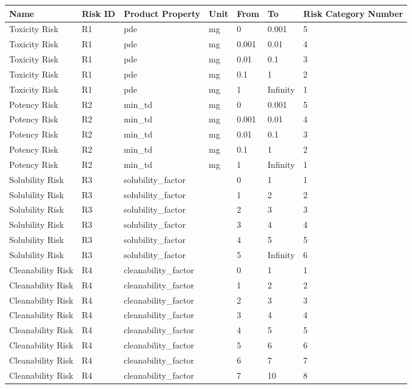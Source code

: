 \documentclass{article}
\begin{document}
        \begin{longtable}[l]{|p{3cm}|p{2cm}|p{3cm}|p{1.3cm}|p{1cm}|p{1cm}|p{4cm}|}

\hline
Name & Risk ID & Product Property & Unit & From & To & Risk Category Number\\
\hline

Toxicity Risk & R1 & pde & mg & 0 & 0.001 & 5\\
\hline
Toxicity Risk & R1 & pde & mg & 0.001 & 0.01 & 4\\
\hline
Toxicity Risk & R1 & pde & mg & 0.01 & 0.1 & 3\\
\hline
Toxicity Risk & R1 & pde & mg & 0.1 & 1 & 2\\
\hline
Toxicity Risk & R1 & pde & mg & 1 & Infinity & 1\\
\hline
Potency Risk & R2 & min\_td & mg & 0 & 0.001 & 5\\
\hline
Potency Risk & R2 & min\_td & mg & 0.001 & 0.01 & 4\\
\hline
Potency Risk & R2 & min\_td & mg & 0.01 & 0.1 & 3\\
\hline
Potency Risk & R2 & min\_td & mg & 0.1 & 1 & 2\\
\hline
Potency Risk & R2 & min\_td & mg & 1 & Infinity & 1\\
\hline
Solubility Risk & R3 & solubility\_factor &  & 0 & 1 & 1\\
\hline
Solubility Risk & R3 & solubility\_factor &  & 1 & 2 & 2\\
\hline
Solubility Risk & R3 & solubility\_factor &  & 2 & 3 & 3\\
\hline
Solubility Risk & R3 & solubility\_factor &  & 3 & 4 & 4\\
\hline
Solubility Risk & R3 & solubility\_factor &  & 4 & 5 & 5\\
\hline
Solubility Risk & R3 & solubility\_factor &  & 5 & Infinity & 6\\
\hline
Cleanability Risk & R4 & cleanability\_factor &  & 0 & 1 & 1\\
\hline
Cleanability Risk & R4 & cleanability\_factor &  & 1 & 2 & 2\\
\hline
Cleanability Risk & R4 & cleanability\_factor &  & 2 & 3 & 3\\
\hline
Cleanability Risk & R4 & cleanability\_factor &  & 3 & 4 & 4\\
\hline
Cleanability Risk & R4 & cleanability\_factor &  & 4 & 5 & 5\\
\hline
Cleanability Risk & R4 & cleanability\_factor &  & 5 & 6 & 6\\
\hline
Cleanability Risk & R4 & cleanability\_factor &  & 6 & 7 & 7\\
\hline
Cleanability Risk & R4 & cleanability\_factor &  & 7 & 10 & 8\\
\hline

    \end{longtable}
    
        
\end{document}
